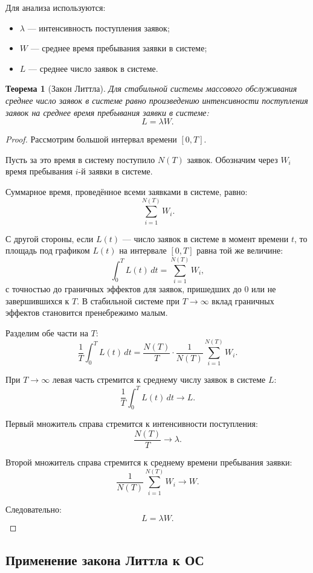 \documentclass[12pt,a4paper]{article}
\newtheorem{theorem}{Теорема}
\begin{document}
Для анализа используются:

\begin{itemize}
    \item $\lambda$ --- интенсивность поступления заявок;
    \item $W$ --- среднее время пребывания заявки в системе;
    \item $L$ --- среднее число заявок в системе.
\end{itemize}

\begin{theorem}[Закон Литтла]
Для стабильной системы массового обслуживания среднее число заявок в системе равно произведению интенсивности поступления заявок на среднее время пребывания заявки в системе:
\[
L = \lambda W.
\]
\end{theorem}

\begin{proof}
Рассмотрим большой интервал времени $[0,T]$.

Пусть за это время в систему поступило $N(T)$ заявок. Обозначим через $W_i$ время пребывания $i$-й заявки в системе.

Суммарное время, проведённое всеми заявками в системе, равно:
\[
\sum_{i=1}^{N(T)} W_i.
\]

С другой стороны, если $L(t)$ --- число заявок в системе в момент времени $t$, то площадь под графиком $L(t)$ на интервале $[0,T]$ равна той же величине:
\[
\int_0^T L(t)\,dt = \sum_{i=1}^{N(T)} W_i,
\]
с точностью до граничных эффектов для заявок, пришедших до $0$ или не завершившихся к $T$. В стабильной системе при $T \to \infty$ вклад граничных эффектов становится пренебрежимо малым.

Разделим обе части на $T$:
\[
\frac{1}{T}\int_0^T L(t)\,dt =
\frac{N(T)}{T} \cdot
\frac{1}{N(T)}\sum_{i=1}^{N(T)} W_i.
\]

При $T \to \infty$ левая часть стремится к среднему числу заявок в системе $L$:
\[
\frac{1}{T}\int_0^T L(t)\,dt \to L.
\]

Первый множитель справа стремится к интенсивности поступления:
\[
\frac{N(T)}{T} \to \lambda.
\]

Второй множитель справа стремится к среднему времени пребывания заявки:
\[
\frac{1}{N(T)}\sum_{i=1}^{N(T)} W_i \to W.
\]

Следовательно:
\[
L = \lambda W.
\]
\end{proof}

\subsection{Применение закона Литтла к ОС}
\end{document}
